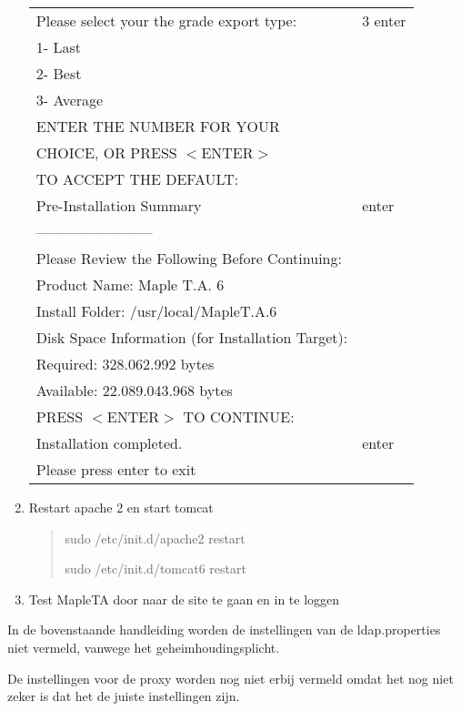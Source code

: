 \begin{enumerate}
\begin{tabular}{ | l | l |}
				 \hline
				 Please select your the grade export type: & 3 enter\\
				 1- Last &\\
  			 2- Best &\\
  			 3- Average &\\
  			 ENTER THE NUMBER FOR YOUR &\\
			   CHOICE, OR PRESS $<$ENTER$>$ & \\
			   TO ACCEPT THE DEFAULT: & \\
  			 \hline
  			 Pre-Installation Summary & enter \\
  			 ------------------------ & \\
				 Please Review the Following Before Continuing:& \\
				
				 Product Name: Maple T.A. 6 & \\
				
				 Install Folder: /usr/local/MapleT.A.6& \\
				
				 Disk Space Information (for Installation Target):& \\
				 Required:  328.062.992 bytes& \\
				 Available: 22.089.043.968 bytes& \\
				 PRESS $<$ENTER$>$ TO CONTINUE:& \\
				 \hline
				 Installation completed. & enter \\
				 Please press enter to exit &\\
				 \hline
			\end{tabular}
		\item Restart apache 2 en start tomcat
			\begin{quote}
				sudo /etc/init.d/apache2 restart
				
				sudo /etc/init.d/tomcat6 restart
			\end{quote}
		\item Test MapleTA door naar de site te gaan en in te loggen
\end{enumerate}

In de bovenstaande handleiding worden de instellingen van de ldap.properties niet vermeld, vanwege het geheimhoudingsplicht. 

De instellingen voor de proxy worden nog niet erbij vermeld omdat het nog niet zeker is dat het de juiste instellingen zijn. 






